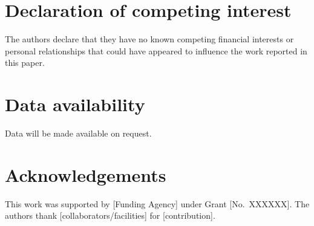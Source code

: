 \documentclass[preprint,12pt,3p]{elsarticle}
\begin{document}
\section*{Declaration of competing interest}
The authors declare that they have no known competing financial interests or personal
relationships that could have appeared to influence the work reported in this paper.

\section*{Data availability}
Data will be made available on request.

\section*{Acknowledgements}
This work was supported by [Funding Agency] under Grant [No.\ XXXXXX].
The authors thank [collaborators/facilities] for [contribution].

%


\end{document}

